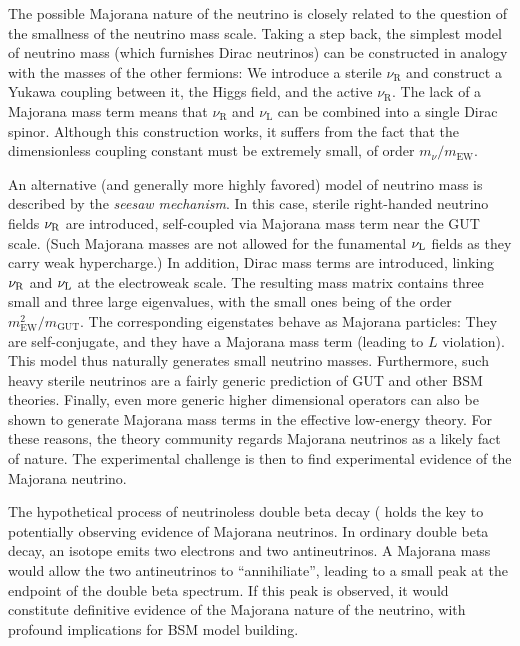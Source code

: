 \documentclass[../thesis.tex]{subfiles}
\begin{document}
The possible Majorana nature of the neutrino is closely related to the question
of the smallness of the neutrino mass scale. Taking a step back, the simplest
model of neutrino mass (which furnishes Dirac neutrinos) can be constructed in
analogy with the masses of the other fermions: We introduce a sterile
$\nu_{\text{R}}$ and construct a Yukawa coupling between it, the Higgs field, and
the active $\nu_{\text{R}}$. The lack of a Majorana mass term means that
$\nu_{\text{R}}$ and $\nu_{\text{L}}$ can be combined into a single Dirac spinor.
Although this construction works, it suffers from the fact that the
dimensionless coupling constant must be extremely small, of order
$m_\nu/m_{\text{EW}}$.

An alternative (and generally more highly favored) model of neutrino mass is
described by the \emph{seesaw mechanism}. In this case, sterile right-handed
neutrino fields $\nu_{\text{R}}$ are introduced, self-coupled via Majorana mass term near
the GUT scale. (Such Majorana masses are not allowed for the funamental $\nu_{\text{L}}$
fields as they carry weak hypercharge.) In addition, Dirac mass terms are
introduced, linking $\nu_{\text{R}}$ and $\nu_{\text{L}}$ at the electroweak scale. The resulting
mass matrix contains three small and three large eigenvalues, with the small
ones being of the order $m^2_{\text{EW}} / m_{\text{GUT}}$. The corresponding
eigenstates behave as Majorana particles: They are self-conjugate, and they have
a Majorana mass term (leading to $L$ violation). This model thus naturally
generates small neutrino masses. Furthermore, such heavy sterile neutrinos are a
fairly generic prediction of GUT and other BSM theories. Finally, even more
generic higher dimensional operators can also be shown to generate Majorana mass
terms in the effective low-energy theory. For these reasons, the theory
community regards Majorana neutrinos as a likely fact of nature. The
experimental challenge is then to find experimental evidence of the Majorana
neutrino.

The hypothetical process of neutrinoless double beta decay (\ndbd\) holds the
key to potentially observing evidence of Majorana neutrinos. In ordinary double
beta decay, an isotope emits two electrons and two antineutrinos. A Majorana
mass would allow the two antineutrinos to ``annihiliate'', leading to a small
peak at the endpoint of the double beta spectrum. If this peak is observed, it
would constitute definitive evidence of the Majorana nature of the neutrino,
with profound implications for BSM model building.
\end{document}
